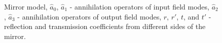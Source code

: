 \begin{figure}
\centering



\caption{Mirror model, $\hat{a}_0$, $\hat{a}_1$ - annihilation operators of input field modes, $\hat{a}_2$, $\hat{a}_3$ - annihilation operators of output field modes, $r$, $r'$, $t$, and $t'$ - reflection and transmission coefficients from different sides of the mirror.}
\label{figPart2Interfero_1}
\end{figure}